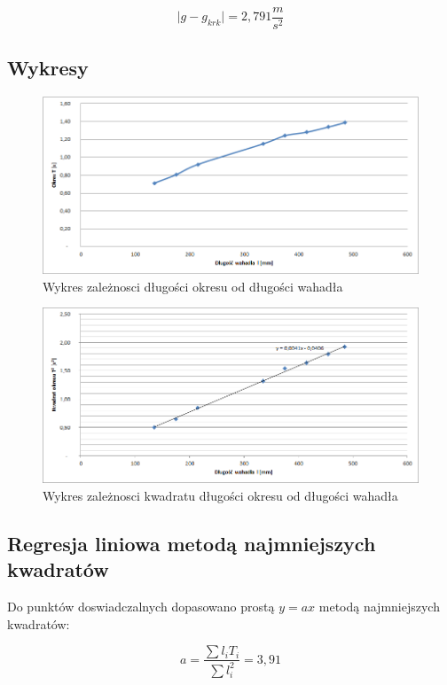 \documentclass[a4paper,10pt,twoside]{article}
\begin{document}
$$\vert g - g_{krk} \vert = 2,791 \unit{\frac{m}{s^2}}$$

\newpage

\subsection{Wykresy}

\begin{figure}[!htp]
\centerline{\includegraphics[scale=1]{wykres1.png}}
\caption{Wykres zależnosci długości okresu od długości wahadła}
\label{fig:tl}
\end{figure}

\begin{figure}[!htp]
\centerline{\includegraphics[scale=1]{wykres2.png}}
\caption{Wykres zależnosci kwadratu długości okresu od długości wahadła}
\label{fig:ttl}
\end{figure}

\subsection{Regresja liniowa metodą najmniejszych kwadratów}

Do punktów doswiadczalnych dopasowano prostą $y = a x$ metodą najmniejszych kwadratów:

$$ a = \frac{\sum l_i T_i}{\sum l_i^2} = 3,91 $$
\end{document}
